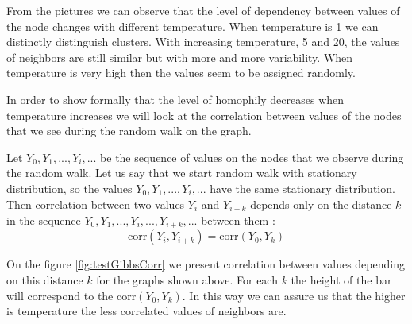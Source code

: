 \documentclass[12pt]{report}
\begin{document}
From the pictures we can observe that the level of dependency between values of the node changes with different temperature. When temperature is 1 we can distinctly distinguish clusters. With increasing temperature, 5 and 20, the values of neighbors are still similar but with more and more variability. When temperature is very high then the values seem to be assigned randomly.

In order to show formally that the level of homophily decreases when temperature increases we will look at the correlation between values of the nodes that we see during the random walk on the graph.

Let $Y_0, Y_1, ..., Y_i, ...$ be the sequence of values on the nodes that we observe during the random walk. Let us say that we start random walk with stationary distribution, so the values $Y_0, Y_1, ..., Y_i, ...$ have the same stationary distribution. Then correlation between  two values $Y_i$ and $Y_{i+k}$ depends only on the distance $k$ in the sequence $Y_0, Y_1, ..., Y_i, ..., Y_{i+k}, ...$ between them \cite{bremaud2013markov}:
$$\mathrm{corr}(Y_i, Y_{i+k}) = \mathrm{corr}(Y_0, Y_k)$$


On the figure \ref{fig:testGibbsCorr} we present correlation between values depending on this distance $k$ for the graphs shown above. For each $k$ the height of the bar will correspond to the $\mathrm{corr}(Y_0, Y_k)$. In this way we can assure us that the higher is temperature the less correlated values of neighbors are.
\end{document}
